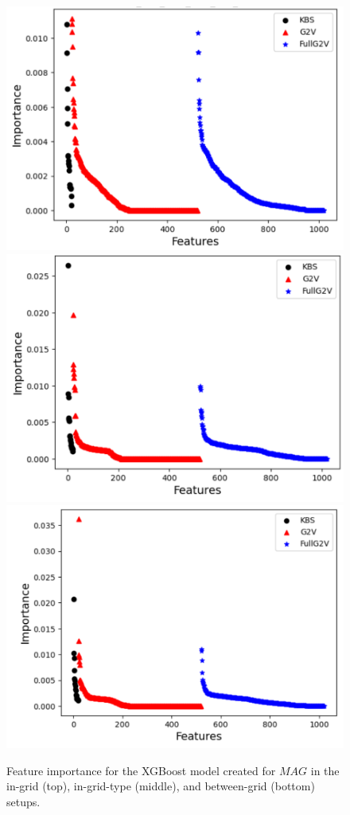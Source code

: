 \documentclass{ecai}
\newcommand{\mapfgas}[1]{\ensuremath{\textit{MAG}}\xspace}
\begin{document}
\begin{figure}[tbh]
    \centering
    \includegraphics[width=0.8\columnwidth]{Images/in-grid-fi.pdf}\\
    \includegraphics[width=0.8\columnwidth]{Images/in-grid-type-fi.pdf}\\
    \includegraphics[width=0.8\columnwidth]{Images/between-grid-fi2.pdf}
    \caption{Feature importance for the XGBoost model created for \mapfgas\, in the in-grid (top), in-grid-type (middle), and between-grid (bottom) setups.} 
    \label{fig:model_coefs}
\end{figure}
\end{document}

